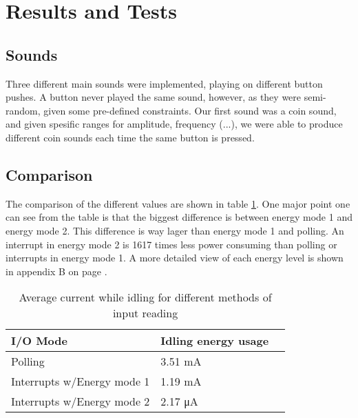 \section{Results and Tests}

\subsection{Sounds}

Three different main sounds were implemented, playing on different button pushes. A button never played the same sound, however, as they were semi-random, given some pre-defined constraints. Our first sound was a coin sound, and given spesific ranges for amplitude, frequency (...), we were able to produce different coin sounds each time the same button is pressed.

\subsection{Comparison}

The comparison of the different values are shown in table \ref{tab:energy_usage}.
One major point one can see from the table is that the biggest difference is between energy mode 1 and energy mode 2. This difference is way lager than energy mode 1 and polling. An interrupt in energy mode 2 is 1617 times less power consuming than polling or interrupts in energy mode 1.
A more detailed view of each energy level is shown in appendix B on page \pageref{appendix:b}.

\begin{table}[ht!]
    \begin{center}
    \begin{tabular}{ | l | l | l | }
        \hline
        I/O Mode    & Idling energy usage \\
        \hline
        Polling & 3.51 mA \\
        \hline
        Interrupts w/Energy mode 1 & 1.19 mA \\
        \hline
        Interrupts w/Energy mode 2 & 2.17 \si{\micro\ampere} \\
        \hline
    \end{tabular}
    \caption{Average current while idling for different methods of input reading}
    \label{tab:energy_usage}
    \end{center}
\end{table}

